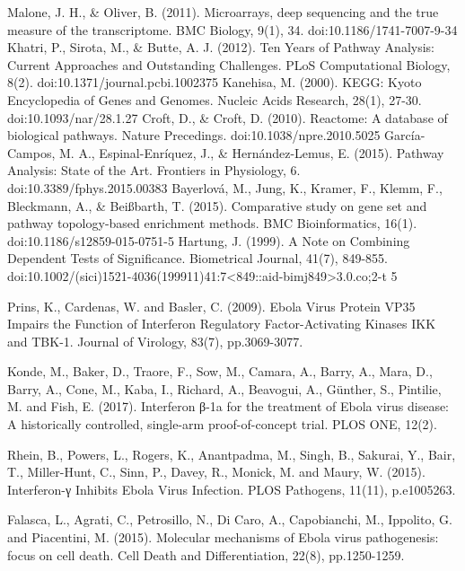 \documentclass[twocolumn]{article}
\begin{document}
\begin{thebibliography}{9}

	Malone, J. H., \& Oliver, B. (2011). Microarrays, deep sequencing and the true measure of the transcriptome. BMC Biology, 9(1), 34. doi:10.1186/1741-7007-9-34
	Khatri, P., Sirota, M., \& Butte, A. J. (2012). Ten Years of Pathway Analysis: Current Approaches and Outstanding Challenges. PLoS Computational Biology, 8(2). doi:10.1371/journal.pcbi.1002375
	Kanehisa, M. (2000). KEGG: Kyoto Encyclopedia of Genes and Genomes. Nucleic Acids Research, 28(1), 27-30. doi:10.1093/nar/28.1.27
	Croft, D., \& Croft, D. (2010). Reactome: A database of biological pathways. Nature Precedings. doi:10.1038/npre.2010.5025
	García-Campos, M. A., Espinal-Enríquez, J., \& Hernández-Lemus, E. (2015). Pathway Analysis: State of the Art. Frontiers in Physiology, 6. doi:10.3389/fphys.2015.00383
	Bayerlová, M., Jung, K., Kramer, F., Klemm, F., Bleckmann, A., \& Beißbarth, T. (2015). Comparative study on gene set and pathway topology-based enrichment methods. BMC Bioinformatics, 16(1). doi:10.1186/s12859-015-0751-5
	Hartung, J. (1999). A Note on Combining Dependent Tests of Significance. Biometrical Journal, 41(7), 849-855. doi:10.1002/(sici)1521-4036(199911)41:7<849::aid-bimj849>3.0.co;2-t 5

	Prins, K., Cardenas, W. and Basler, C. (2009). Ebola Virus Protein VP35 Impairs the Function of Interferon Regulatory Factor-Activating Kinases IKK and TBK-1. Journal of Virology, 83(7), pp.3069-3077.

	Konde, M., Baker, D., Traore, F., Sow, M., Camara, A., Barry, A., Mara, D., Barry, A., Cone, M., Kaba, I., Richard, A., Beavogui, A., Günther, S., Pintilie, M. and Fish, E. (2017). Interferon β-1a for the treatment of Ebola virus disease: A historically controlled, single-arm proof-of-concept trial. PLOS ONE, 12(2).

	Rhein, B., Powers, L., Rogers, K., Anantpadma, M., Singh, B., Sakurai, Y., Bair, T., Miller-Hunt, C., Sinn, P., Davey, R., Monick, M. and Maury, W. (2015). Interferon-γ Inhibits Ebola Virus Infection. PLOS Pathogens, 11(11), p.e1005263.

	Falasca, L., Agrati, C., Petrosillo, N., Di Caro, A., Capobianchi, M., Ippolito, G. and Piacentini, M. (2015).
	 Molecular mechanisms of Ebola virus pathogenesis: focus on cell death. Cell Death and Differentiation, 22(8), pp.1250-1259.


\end{thebibliography}
\end{document}
